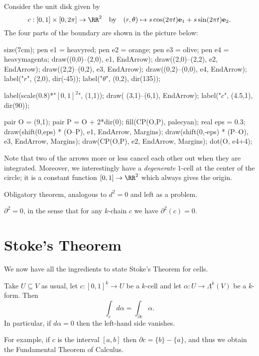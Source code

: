 \documentclass[11pt]{scrreprt}
\begin{document}
\begin{example}
	Consider the unit disk given by
	\[ c : [0,1] \times [0,2\pi] \to \RR^2 \quad\text{by}\quad
	(r,\theta) \mapsto s\cos(2\pi t)\ee_1 + s\sin(2\pi t)\ee_2. \]
	The four parts of the boundary are shown in the picture below:
	\begin{center}
		\begin{asy}
			size(7cm);
			pen e1 = heavyred;
			pen e2 = orange;
			pen e3 = olive;
			pen e4 = heavymagenta;
			draw((0,0)--(2,0), e1, EndArrow);
			draw((2,0)--(2,2), e2, EndArrow);
			draw((2,2)--(0,2), e3, EndArrow);
			draw((0,2)--(0,0), e4, EndArrow);
			label("$r$", (2,0), dir(-45));
			label("$\theta$", (0,2), dir(135));

			label(scale(0.8)*"$[0,1]^2$", (1,1));
			draw( (3,1)--(6,1), EndArrow);
			label("$c$", (4.5,1), dir(90));

			pair O = (9,1);
			pair P = O + 2*dir(0);
			fill(CP(O,P), palecyan);
			real eps = 0.3;
			draw(shift(0,eps) * (O--P), e1, EndArrow, Margins);
			draw(shift(0,-eps) * (P--O), e3, EndArrow, Margins);
			draw(CP(O,P), e2, EndArrow, Margins);
			dot(O, e4+4);
		\end{asy}
	\end{center}
	Note that two of the arrows more or less cancel each other out when they are integrated.
	Moreover, we interestingly have a \emph{degenerate} $1$-cell at the center of the circle;
	it is a constant function $[0,1] \to \RR^2$ which always gives the origin.
\end{example}

Obligatory theorem, analogous to $d^2=0$ and left as a problem.
\begin{theorem}
	$\partial^2 = 0$, in the sense that for any $k$-chain $c$ we have $\partial^2(c) = 0$.
\end{theorem}

\section{Stoke's Theorem}

We now have all the ingredients to state Stoke's Theorem for cells.
\begin{theorem}
	Take $U \subseteq V$ as usual, let $c : [0,1]^k \to U$ be a $k$-cell
	and let $\alpha : U \to \Lambda^k(V)$ be a $k$-form.
	Then
	\[ \int_c d\alpha = \int_{\partial c} \alpha. \]
	In particular, if $d\alpha = 0$ then the left-hand side vanishes.
\end{theorem}
For example, if $c$ is the interval $[a,b]$ then $\partial c = \{b\} - \{a\}$,
and thus we obtain the Fundamental Theorem of Calculus.
\end{document}
